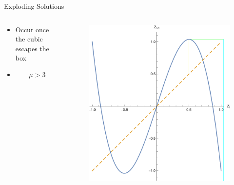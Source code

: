 \documentclass{beamer}
\begin{document}
\begin{frame}{Exploding Solutions}
	\begin{columns}
		\begin{column}{0.5\textwidth}
			\begin{itemize}
				\item
					Occur once the cubic escapes the box
				\item
					\begin{equation*}
						\mu>3
					\end{equation*}
			\end{itemize}
		\end{column}
		\begin{column}{0.5\textwidth}
			\begin{figure}
				\centering
				\includegraphics[height=\textheight]{exploding.pdf}
			\end{figure}
		\end{column}
	\end{columns}
\end{frame}
\end{document}
